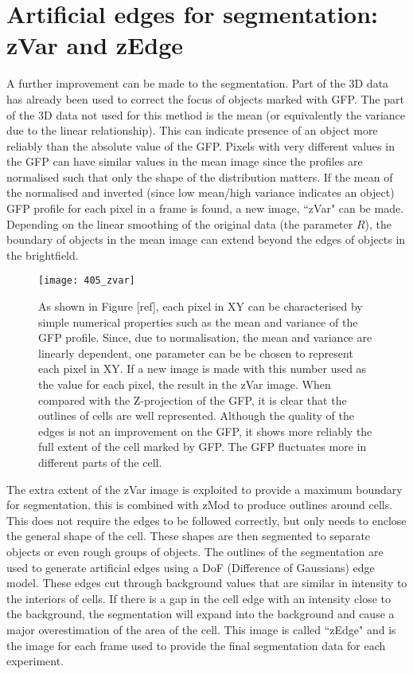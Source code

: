 \section{Artificial edges for segmentation: zVar and zEdge}

A further improvement can be made to the segmentation. Part of the 3D data has already been used to correct the focus of objects marked with GFP. The part of the 3D data not used for this method is the mean (or equivalently the variance due to the linear relationship). This can indicate presence of an object more reliably than the absolute value of the GFP. Pixels with very different values in the GFP can have similar values in the mean image since the profiles are normalised such that only the shape of the distribution matters. If the mean of the normalised and inverted (since low mean/high variance indicates an object) GFP profile for each pixel in a frame is found, a new image, ``zVar" can be made. Depending on the linear smoothing of the original data (the parameter $R$), the boundary of objects in the mean image can extend beyond the edges of objects in the brightfield.

\begin{figure}[p]
 \centering
 \texttt{[image: 405\_zvar]}
 \caption[zVar example]{
 	As shown in Figure [ref], each pixel in XY can be characterised by simple numerical properties such as the mean and variance of the GFP profile. Since, due to normalisation, the mean and variance are linearly dependent, one parameter can be be chosen to represent each pixel in XY. If a new image is made with this number used as the value for each pixel, the result in the zVar image. When compared with the Z-projection of the GFP, it is clear that the outlines of cells are well represented. Although the quality of the edges is not an improvement on the GFP, it shows more reliably the full extent of the cell marked by GFP. The GFP fluctuates more in different parts of the cell.
 }
 \label{fig:zvar}
\end{figure}

The extra extent of the zVar image is exploited to provide a maximum boundary for segmentation, this is combined with zMod to produce outlines around cells. This does not require the edges to be followed correctly, but only needs to enclose the general shape of the cell. These shapes are then segmented to separate objects or even rough groups of objects. The outlines of the segmentation are used to generate artificial edges using a DoF (Difference of Gaussians) edge model. These edges cut through background values that are similar in intensity to the interiors of cells. If there is a gap in the cell edge with an intensity close to the background, the segmentation will expand into the background and cause a major overestimation of the area of the cell. This image is called ``zEdge" and is the image for each frame used to provide the final segmentation data for each experiment.

